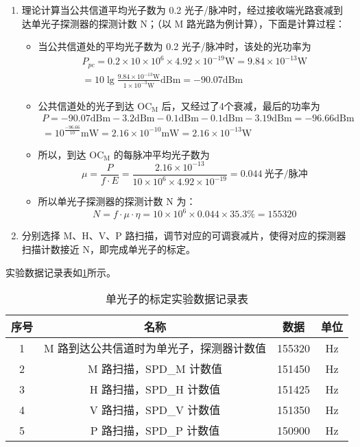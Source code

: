 \documentclass[dvipsnames, svgnames,a4paper,11pt]{article}
\begin{document}
		\begin{enumerate}
			\item 理论计算当公共信道平均光子数为 0.2 光子/脉冲时，经过接收端光路衰减到达单光子探测器的探测计数 N；（以 M 路光路为例计算），下面是计算过程：
				\begin{itemize}
					\item 当公共信道处的平均光子数为 0.2 光子/脉冲时，该处的光功率为
						\begin{align*}
							P_{pc} = 0.2 \times 10 \times 10^{6} \times 4.92 \times 10^{-19} \mathrm{W} = 9.84 \times 10^{-13} \mathrm{W}	\\
							= 10 \lg \frac{9.84 \times 10^{-13} \mathrm{W}}{1 \times 10^{-3} \mathrm{W}} \mathrm{dBm} = -90.07 \mathrm{dBm} 
						\end{align*}

					\item 公共信道处的光子到达 $\mathrm{OC_M}$ 后，又经过了4个衰减，最后的功率为
						\begin{align*}
							P = -90.07 \mathrm{dBm} - 3.2 \mathrm{dBm} - 0.1 \mathrm{dBm} - 0.1 \mathrm{dBm} - 3.19 \mathrm{dBm} = -96.66 \mathrm{dBm}	\\
							= 10^{\frac{-96.66}{10}} \mathrm{mW} = 2.16 \times 10^{-10} \mathrm{mW} = 2.16 \times 10^{-13} \mathrm{W}
						\end{align*}

					\item 所以，到达 $\mathrm{OC_M}$ 的每脉冲平均光子数为 
						$$ \mu = \frac{P}{f \cdot E} = \frac{2.16 \times 10^{-13}}{10 \times 10^{6} \times 4.92 \times 10^{-19}} = 0.044 \ \text{光子/脉冲} $$

					\item 所以单光子探测器的探测计数 N 为：
						$$ N = f \cdot \mu \cdot \eta = 10 \times 10^{6} \times 0.044 \times 35.3 \% = 155320 $$
				\end{itemize}

			\item 分别选择 M、H、V、P 路扫描，调节对应的可调衰减片，使得对应的探测器扫描计数接近 N，即完成单光子的标定。
		\end{enumerate}

		实验数据记录表如\cref{tbl:D3-3-1}所示。



			\begin{table}[htbp]
				\centering
				\begin{tabular}{|c|c|cc|} 
				\hline
				序号 & 名称                    & 数据     & 单位  \\ 
				\hline
				1  & M 路到达公共信道时为单光子，探测器计数值 & 155320 & Hz  \\
				2  & M 路扫描，SPD\_M 计数值      & 151450 & Hz  \\
				3  & H 路扫描，SPD\_H 计数值      & 151425 & Hz  \\
				4  & V 路扫描，SPD\_V 计数值      & 151350 & Hz  \\
				5  & P 路扫描，SPD\_P 计数值      & 150900 & Hz  \\
				\hline
				\end{tabular}
				\caption{单光子的标定实验数据记录表}
				\label{tbl:D3-3-1}
			\end{table}
\end{document}
